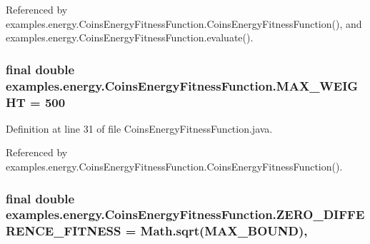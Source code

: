 Referenced by examples.\-energy.\-Coins\-Energy\-Fitness\-Function.\-Coins\-Energy\-Fitness\-Function(), and examples.\-energy.\-Coins\-Energy\-Fitness\-Function.\-evaluate().

\hypertarget{classexamples_1_1energy_1_1_coins_energy_fitness_function_a2dcea27142210c447f29ef1ffb12fed3}{
\subsubsection[{M\-A\-X\-\_\-\-W\-E\-I\-G\-H\-T}]{\setlength{\rightskip}{0pt plus 5cm}final double examples.\-energy.\-Coins\-Energy\-Fitness\-Function.\-M\-A\-X\-\_\-\-W\-E\-I\-G\-H\-T = 500\hspace{0.3cm}{\ttfamily [static]}}}\label{classexamples_1_1energy_1_1_coins_energy_fitness_function_a2dcea27142210c447f29ef1ffb12fed3}


Definition at line 31 of file Coins\-Energy\-Fitness\-Function.\-java.



Referenced by examples.\-energy.\-Coins\-Energy\-Fitness\-Function.\-Coins\-Energy\-Fitness\-Function().

\hypertarget{classexamples_1_1energy_1_1_coins_energy_fitness_function_aa4488040e568b03f30ad220c4425e612}{
\subsubsection[{Z\-E\-R\-O\-\_\-\-D\-I\-F\-F\-E\-R\-E\-N\-C\-E\-\_\-\-F\-I\-T\-N\-E\-S\-S}]{\setlength{\rightskip}{0pt plus 5cm}final double examples.\-energy.\-Coins\-Energy\-Fitness\-Function.\-Z\-E\-R\-O\-\_\-\-D\-I\-F\-F\-E\-R\-E\-N\-C\-E\-\_\-\-F\-I\-T\-N\-E\-S\-S = Math.\-sqrt({\bf M\-A\-X\-\_\-\-B\-O\-U\-N\-D})\hspace{0.3cm}{\ttfamily [static]}, {\ttfamily [private]}}}\label{classexamples_1_1energy_1_1_coins_energy_fitness_function_aa4488040e568b03f30ad220c4425e612}


